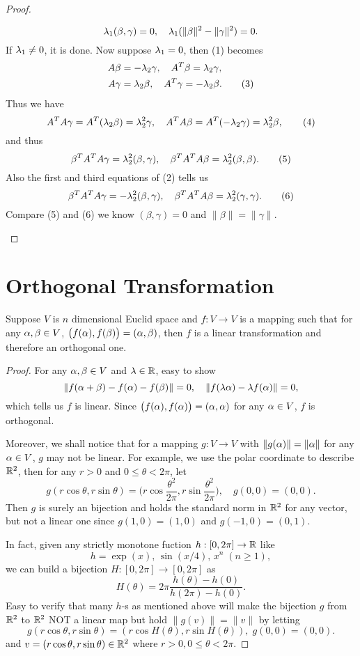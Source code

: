 \begin{proof}
\begin{description}
	\[\lambda_1(\beta,\gamma)=0,\quad \lambda_1(\|\beta\|^2-\|\gamma\|^2)=0.\]
	If $\lambda_1\neq 0$, it is done. Now suppose $\lambda_1=0$, then (1) becomes
	\begin{align*}
		A\beta&= -\lambda_2\gamma,\quad A^T\beta=\lambda_2\gamma,\\
		A\gamma&=\lambda_2\beta,\quad A^T\gamma=-\lambda_2\beta.\tag{3}
	\end{align*}
	Thus we have 
	\[A^TA\gamma=A^T(\lambda_2\beta)=\lambda_2^2\gamma,\quad A^TA\beta=A^T(-\lambda_2\gamma)=\lambda_2^2\beta,\tag{4}\]
	and thus
	\[\beta^TA^TA\gamma=\lambda_2^2(\beta,\gamma),\quad \beta^TA^TA\beta=\lambda_2^2(\beta,\beta).\tag{5}\]
	Also the first and third equations of (2) tells us
	\[\beta^TA^TA\gamma=-\lambda_2^2(\beta,\gamma),\quad \beta^TA^TA\beta=\lambda_2^2(\gamma,\gamma).\tag{6}\]
	Compare (5) and (6) we know $(\beta,\gamma)=0$ and $\|\beta\|=\|\gamma\|$.\qedhere
	\end{description}
\end{proof}

\section{Orthogonal Transformation}
\begin{pro}%
	Suppose $V$ is $n$ dimensional Euclid space and $f\colon V\to V$ is a mapping such that for any $\alpha,\beta\in V$, $\big(f(\alpha),f(\beta)\big)=(\alpha,\beta)$, then $f$ is a linear transformation and therefore an orthogonal one.
\end{pro}
\begin{proof}
	For any $\alpha,\beta\in V$ and $\lambda\in\mathbb{R}$, easy to show 
	\[\|f(\alpha+\beta)-f(\alpha)-f(\beta)\|=0,\quad \|f(\lambda\alpha)-\lambda f(\alpha)\|=0,\]
	which tells us $f$ is linear. Since $\big(f(\alpha),f(\alpha)\big)=(\alpha,\alpha)$ for any $\alpha\in V$, $f$ is orthogonal. 

	Moreover, we shall notice that for a mapping $g\colon V\to V$ with $\|g(\alpha)\|=\|\alpha\|$ for any $\alpha\in V$, $g$ may not be linear. For example, we use the polar coordinate to describe $\mathbb{R}^2$, then for any $r>0$ and $0\leq \theta<2\pi$, let
	\[g(r\cos\theta,r\sin\theta)=\Big(r\cos\frac{\theta^2}{2\pi},r\sin\frac{\theta^2}{2\pi}\Big),\quad g(0,0)=(0,0).\]
	Then $g$ is surely an bijection and holds the standard norm in $\mathbb{R}^2$ for any vector, but not a linear one since $g(1,0)=(1,0)$ and $g(-1,0)=(0,1)$.

	In fact, given any strictly monotone fuction $h:[0,2\pi]\to\mathbb{R}$ like 
	\[h=\exp(x),\,\sin(x/4),\,x^n\;(n\geq 1),\]
	we can build a bijection $H:[0,2\pi]\to [0,2\pi]$ as
	\[H(\theta)=2\pi\frac{h(\theta)-h(0)}{h(2\pi)-h(0)}.\]
	Easy to verify that many $h$-s as mentioned above will make the bijection $g$ from $\mathbb{R}^2$ to $\mathbb{R}^2$  NOT a linear map but hold $\|g(v)\|=\|v\|$ by letting 
	\[g(r\cos\theta,r\sin\theta)=(r\cos H(\theta),r\sin H(\theta)),\;g(0,0)=(0,0).\]
	and $v=(r\cos\theta,r\sin\theta)\in\mathbb{R}^2$ where $r>0,0\leq \theta<2\pi$.
\end{proof}